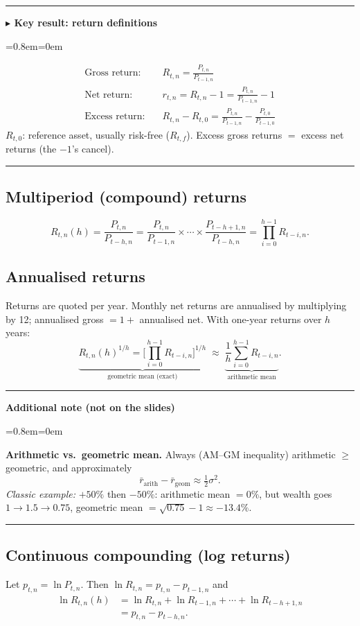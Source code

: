 \documentclass[11pt,a4paper]{report}
\newenvironment{notebox}[1]
  {\par\medskip\Needspace{6\baselineskip}\noindent\rule{\linewidth}{0.4pt}\par\nopagebreak
   \noindent\textbf{#1}\par\nopagebreak
   \begin{list}{}{\leftmargin=0.8em\rightmargin=0em\topsep=2pt}\item[]}
  {\end{list}\nopagebreak\noindent\rule{\linewidth}{0.4pt}\par\medskip}
\newenvironment{keybox}[1][]{\begin{notebox}{$\blacktriangleright$ Key result#1}}{\end{notebox}}
\newenvironment{addnote}{\begin{notebox}{Additional note (not on the slides)}}{\end{notebox}}
\begin{document}
\begin{keybox}[: return definitions]
\begin{align*}
\text{Gross return:}\quad & R_{t,n}=\frac{P_{t,n}}{P_{t-1,n}}\\
\text{Net return:}\quad & r_{t,n}=R_{t,n}-1=\frac{P_{t,n}}{P_{t-1,n}}-1\\
\text{Excess return:}\quad & R_{t,n}-R_{t,0}=\frac{P_{t,n}}{P_{t-1,n}}-\frac{P_{t,0}}{P_{t-1,0}}
\end{align*}
$R_{t,0}$: reference asset, usually risk-free ($R_{t,f}$). Excess gross returns
$=$ excess net returns (the $-1$'s cancel).
\end{keybox}

\subsection{Multiperiod (compound) returns}
\[
R_{t,n}(h)=\frac{P_{t,n}}{P_{t-h,n}}
=\frac{P_{t,n}}{P_{t-1,n}}\times\cdots\times\frac{P_{t-h+1,n}}{P_{t-h,n}}
=\prod_{i=0}^{h-1}R_{t-i,n}.
\]

\subsection{Annualised returns}
Returns are quoted per year. Monthly net returns are annualised by
multiplying by 12; annualised gross $=1+$ annualised net. With one-year
returns over $h$ years:
\[
\underbrace{R_{t,n}(h)^{1/h}=\Big[\prod_{i=0}^{h-1}R_{t-i,n}\Big]^{1/h}}_{\text{geometric mean (exact)}}
\;\approx\;
\underbrace{\frac1h\sum_{i=0}^{h-1}R_{t-i,n}}_{\text{arithmetic mean}}.
\]

\begin{addnote}
\textbf{Arithmetic vs.\ geometric mean.} Always (AM--GM inequality)
arithmetic $\ge$ geometric, and approximately
\[
\bar r_{\text{arith}}-\bar r_{\text{geom}}\approx \tfrac12\sigma^2 .
\]
\emph{Classic example:} $+50\%$ then $-50\%$: arithmetic mean $=0\%$, but
wealth goes $1\to1.5\to0.75$, geometric mean $=\sqrt{0.75}-1\approx-13.4\%$.
\end{addnote}

\subsection{Continuous compounding (log returns)}
Let $p_{t,n}=\ln P_{t,n}$. Then $\ln R_{t,n}=p_{t,n}-p_{t-1,n}$ and
\begin{align}
\ln R_{t,n}(h) &= \ln R_{t,n}+\ln R_{t-1,n}+\cdots+\ln R_{t-h+1,n} \label{eq:sum}\\
&= p_{t,n}-p_{t-h,n}. \label{eq:cancel}
\end{align}
\end{document}
